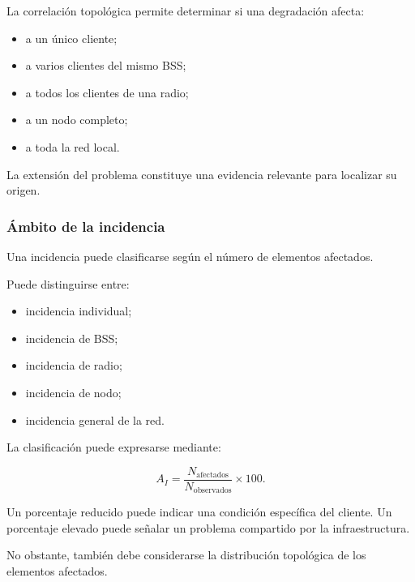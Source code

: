 La correlación topológica permite determinar si una degradación afecta:

\begin{itemize}
    \item a un único cliente;

    \item a varios clientes del mismo BSS;

    \item a todos los clientes de una radio;

    \item a un nodo completo;

    \item a toda la red local.
\end{itemize}

La extensión del problema constituye una evidencia relevante para
localizar su origen.


\subsubsection*{Ámbito de la incidencia}

Una incidencia puede clasificarse según el número de elementos afectados.

Puede distinguirse entre:

\begin{itemize}
    \item incidencia individual;

    \item incidencia de BSS;

    \item incidencia de radio;

    \item incidencia de nodo;

    \item incidencia general de la red.
\end{itemize}

La clasificación puede expresarse mediante:

\[
    A_I
    =
    \frac{
        N_{\mathrm{afectados}}
    }{
        N_{\mathrm{observados}}
    }
    \times
    100.
\]

Un porcentaje reducido puede indicar una condición específica del
cliente. Un porcentaje elevado puede señalar un problema compartido por
la infraestructura.

No obstante, también debe considerarse la distribución topológica de los
elementos afectados.


